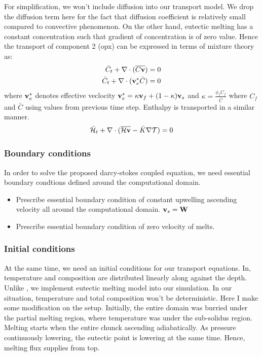For simplification, we won't include diffusion into our transport model.
We drop the diffusion term here for the fact that diffusion coefficient is
relatively small compared to convective phenomenon. On the other hand, 
eutectic melting has a constant concentration such that gradient of 
concentration is of zero value. Hence the transport of component 2 (opx) 
can be expressed in terms of mixture theory as:
\begin{equation}
		  \begin{aligned}
					 \bar{C}_t + \nabla \cdot (\overline{C\bold{v}}) &= 0\\
					 \bar{C}_t + \nabla \cdot (\bold{v}_e^* \bar{C}) &= 0
		  \end{aligned}
\end{equation}
where $\bold{v}_e^*$ denotes effective veclocity 
$\bold{v}_e^* = \kappa \bold{v}_f + (1-\kappa)\bold{v}_s$
and $\kappa = \frac{\phi_f C_f}{\bar{C}}$ where $C_f$ and $\bar{C}$ using 
values from previous time step.
Enthalpy is transported in a similar manner.
\begin{equation}
		  \bar{\mathcal{H}}_t + \nabla \cdot (\overline{\mathcal{H}\bold{v}} - 
		  \bar{K}\nabla \mathcal{T})  = 0
\end{equation}

\subsubsection{Boundary conditions}
In order to solve the proposed darcy-stokes coupled equation, 
we need essential boundary condtions defined around the computational domain.
\begin{itemize}
		  \item Prescribe essential boundary condition of constant upwelling ascending
					 velocity all around the computational domain. $\bold{v}_s = \bold{W}$
	 \item Prescribe essential boundary condition of zero velocity of melts. 
\end{itemize}

\subsubsection{Initial conditions}
At the same time, we need an initial conditions for our transport equations.
In\cite{ModellingMeltingRates}, temperature and composition
are distributed linearly along against the depth. Unlike \cite{ModellingMeltingRates},
we implement eutectic melting model into our simulation. In our situation,
temperature and total composition won't be deterministic.
Here I make some modification on the setup.
Initially, the entire domain was burried under the partial melting region, where temperature was under the 
sub-solidus region.
Melting starts when the entire chunck ascending adiabatically. As pressure continuously lowering, 
the eutectic point is lowering at the same time. Hence, melting flux supplies from top. 

